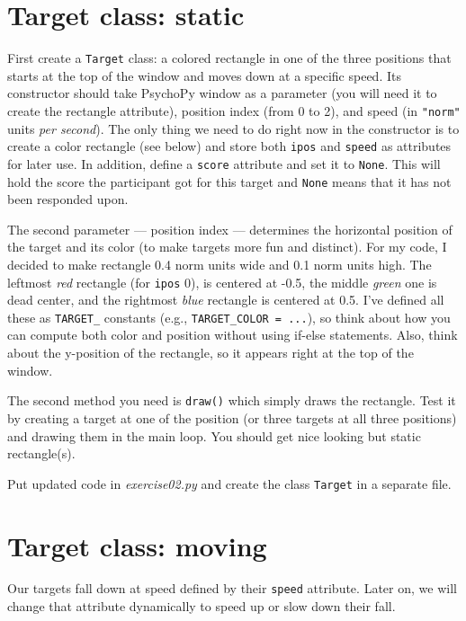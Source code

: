 \documentclass[
]{book}
\begin{document}
\hypertarget{target-class-static}{%
\section{Target class: static}\label{target-class-static}}

First create a \texttt{Target} class: a colored rectangle in one of the three positions that starts at the top of the window and moves down at a specific speed. Its constructor should take PsychoPy window as a parameter (you will need it to create the rectangle attribute), position index (from 0 to 2), and speed (in \texttt{"norm"} units \emph{per second}). The only thing we need to do right now in the constructor is to create a color rectangle (see below) and store both \texttt{ipos} and \texttt{speed} as attributes for later use. In addition, define a \texttt{score} attribute and set it to \texttt{None}. This will hold the score the participant got for this target and \texttt{None} means that it has not been responded upon.

The second parameter --- position index --- determines the horizontal position of the target and its color (to make targets more fun and distinct). For my code, I decided to make rectangle 0.4 norm units wide and 0.1 norm units high. The leftmost \emph{red} rectangle (for \texttt{ipos} 0), is centered at -0.5, the middle \emph{green} one is dead center, and the rightmost \emph{blue} rectangle is centered at 0.5. I've defined all these as \texttt{TARGET\_} constants (e.g., \texttt{TARGET\_COLOR\ =\ ...}), so think about how you can compute both color and position without using if-else statements. Also, think about the y-position of the rectangle, so it appears right at the top of the window.

The second method you need is \texttt{draw()} which simply draws the rectangle. Test it by creating a target at one of the position (or three targets at all three positions) and drawing them in the main loop. You should get nice looking but static rectangle(s).

Put updated code in \emph{exercise02.py} and create the class \texttt{Target} in a separate file.

\hypertarget{target-class-moving}{%
\section{Target class: moving}\label{target-class-moving}}

Our targets fall down at speed defined by their \texttt{speed} attribute. Later on, we will change that attribute dynamically to speed up or slow down their fall.
\end{document}
